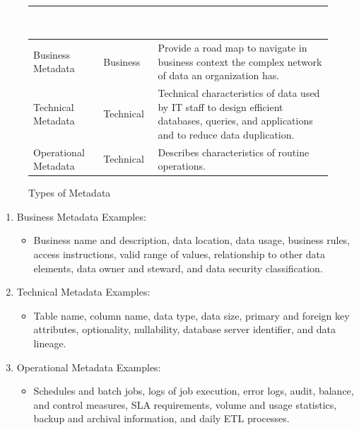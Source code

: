 \begin{figure}[H]
\begin{center}
    \renewcommand{\arraystretch}{1.5}
    \begin{tabular}{|>{\raggedright\arraybackslash}m{3.5cm}
                    |>{\raggedright\arraybackslash}m{3cm}
                    |>{\raggedright\arraybackslash}m{8cm}
                    |}
    \hline
    \rowcolor[HTML]{196fb4}\centering\textcolor{white}{\large Metadata Type} 
                            & \centering\textcolor{white}{\large Data Owner} 
                            & \centering\textcolor{white}{\large Metadata Objective} 
                            \tabularnewline 
    \hline
    Business Metadata & Business & Provide a road map to navigate in business context the complex network of data an organization has. \\\hline
    Technical Metadata & Technical & Technical characteristics of data used by IT staff to design efficient databases, queries, and applications and to reduce data duplication.\\\hline
    Operational Metadata & Technical & Describes characteristics of routine operations.\\\hline
    \end{tabular}
\end{center}
\caption{Types of Metadata}
\label{Types of Metadata}
\end{figure}

\begin{enumerate}
    \item Business Metadata Examples:
    \begin{itemize}
        \item Business name and description, data location, data usage, business rules, access instructions, valid range of values, relationship to other data elements, data owner and steward, and data security classification.
    \end{itemize}
    \item Technical Metadata Examples: 
    \begin{itemize}
        \item Table name, column name, data type, data size, primary and foreign key attributes, optionality, nullability, database server identifier, and data lineage.
    \end{itemize}
    \item Operational Metadata Examples:
    \begin{itemize}
        \item Schedules and batch jobs, logs of job execution, error logs, audit, balance, and control measures, SLA requirements, volume and usage statistics, backup and archival information, and daily ETL processes.
    \end{itemize}
\end{enumerate}

